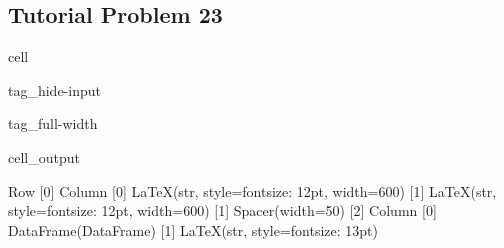 \documentclass[letterpaper,10pt,english]{jupyterBook}
\begin{document}
\subsection{Tutorial Problem 23}
\label{\detokenize{content/tutorials/T9/tutorial_09:tutorial-problem-23}}
\begin{sphinxuseclass}{cell}
\begin{sphinxuseclass}{tag_hide-input}
\begin{sphinxuseclass}{tag_full-width}\begin{sphinxVerbatimOutput}

\begin{sphinxuseclass}{cell_output}
\begin{sphinxVerbatim}[commandchars=\\\{\}]
Row
    [0] Column
        [0] LaTeX(str, style=\PYGZob{}\PYGZsq{}font\PYGZhy{}size\PYGZsq{}: \PYGZsq{}12pt\PYGZsq{}\PYGZcb{}, width=600)
        [1] LaTeX(str, style=\PYGZob{}\PYGZsq{}font\PYGZhy{}size\PYGZsq{}: \PYGZsq{}12pt\PYGZsq{}\PYGZcb{}, width=600)
    [1] Spacer(width=50)
    [2] Column
        [0] DataFrame(DataFrame)
        [1] LaTeX(str, style=\PYGZob{}\PYGZsq{}font\PYGZhy{}size\PYGZsq{}: \PYGZsq{}13pt\PYGZsq{}\PYGZcb{})
\end{sphinxVerbatim}

\end{sphinxuseclass}\end{sphinxVerbatimOutput}

\end{sphinxuseclass}
\end{sphinxuseclass}
\end{sphinxuseclass}
\end{document}
